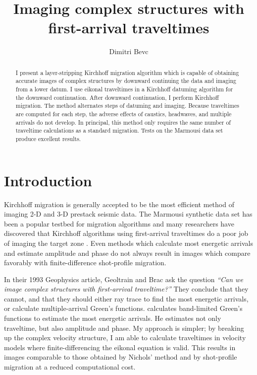 
\title{Imaging complex structures with first-arrival traveltimes}
\author{Dimitri Bevc}
\def\figdir{./Fig}

\begin{abstract}
I present a layer-stripping Kirchhoff migration algorithm which is
capable of obtaining accurate
images of complex structures by downward continuing
the data and imaging from a lower datum.
I use eikonal traveltimes in a Kirchhoff datuming algorithm for the
downward continuation. After downward continuation, I perform
Kirchhoff migration. 
The method alternates steps of datuming and imaging. Because traveltimes
are computed for each step, the adverse effects of caustics, headwaves, and 
multiple arrivals do not develop.
In principal, this method only requires the same number of
traveltime calculations as a standard migration.
Tests on the Marmousi data set produce excellent results.
\end{abstract}

\section{Introduction}
Kirchhoff migration is generally accepted to be the most efficient
method of imaging 2-D and 3-D prestack seismic data.  The Marmousi
synthetic data set \cite[]{TLE13-09-09270936} has been a popular
testbed for migration algorithms and many researchers have discovered
that Kirchhoff algorithms using first-arrival traveltimes do a poor
job of imaging the target zone
\cite[]{Audebert.sep.80.47,GEO59-05-08100817,GEO58-04-05640575}.  Even
methods which calculate most energetic arrivals and estimate amplitude
and phase do not always result in images which compare favorably with
finite-difference shot-profile migration.

In their 1993 Geophysics article, Geoltrain and Brac ask the
question {\em ``Can we image complex structures with first-arrival
traveltime?''} They conclude that they cannot, and that they should 
either ray trace to find the most energetic arrivals, or calculate
multiple-arrival Green's functions. \cite{Nichols.sepphd.81} calculates 
band-limited Green's functions to estimate the most energetic
arrivals. He estimates not only traveltime, but also amplitude and
phase. My approach is simpler; by breaking up the complex
velocity structure, I am able 
to calculate traveltimes in velocity models where
finite-differencing the eikonal equation is valid.
This results in images comparable to those obtained by 
Nichols' method and by shot-profile migration at a reduced
computational cost.

